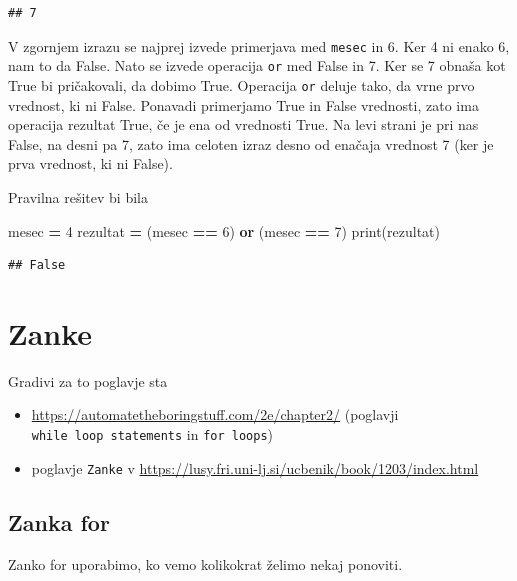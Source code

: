\documentclass[
]{report}
\newenvironment{Shaded}{\begin{snugshade}}{\end{snugshade}}
\newcommand{\BuiltInTok}[1]{#1}
\newcommand{\DecValTok}[1]{\textcolor[rgb]{0.00,0.00,0.81}{#1}}
\newcommand{\KeywordTok}[1]{\textcolor[rgb]{0.13,0.29,0.53}{\textbf{#1}}}
\newcommand{\NormalTok}[1]{#1}
\newcommand{\OperatorTok}[1]{\textcolor[rgb]{0.81,0.36,0.00}{\textbf{#1}}}
\providecommand{\tightlist}{%
  \setlength{\itemsep}{0pt}\setlength{\parskip}{0pt}}
\begin{document}
\begin{verbatim}
## 7
\end{verbatim}

V zgornjem izrazu se najprej izvede primerjava med \texttt{mesec} in 6. Ker 4 ni enako 6,
nam to da False. Nato se izvede operacija \texttt{or} med False in 7. Ker se 7 obnaša
kot True bi pričakovali, da dobimo True. Operacija \texttt{or} deluje tako, da vrne prvo
vrednost, ki ni False. Ponavadi primerjamo True in False vrednosti, zato ima
operacija rezultat True, če je ena od vrednosti True.
Na levi strani je pri nas False, na desni pa 7, zato ima celoten izraz desno
od enačaja vrednost 7 (ker je prva vrednost, ki ni False).

Pravilna rešitev bi bila

\begin{Shaded}
\begin{Highlighting}[]
\NormalTok{mesec }\OperatorTok{=} \DecValTok{4}
\NormalTok{rezultat }\OperatorTok{=}\NormalTok{ (mesec }\OperatorTok{==} \DecValTok{6}\NormalTok{) }\KeywordTok{or}\NormalTok{ (mesec }\OperatorTok{==} \DecValTok{7}\NormalTok{)}
\BuiltInTok{print}\NormalTok{(rezultat)}
\end{Highlighting}
\end{Shaded}

\begin{verbatim}
## False
\end{verbatim}

\hypertarget{zanke}{%
\chapter{Zanke}\label{zanke}}

Gradivi za to poglavje sta

\begin{itemize}
\tightlist
\item
  \url{https://automatetheboringstuff.com/2e/chapter2/} (poglavji \texttt{while\ loop\ statements} in \texttt{for\ loops})
\item
  poglavje \texttt{Zanke} v \url{https://lusy.fri.uni-lj.si/ucbenik/book/1203/index.html}
\end{itemize}

\hypertarget{zanka-for}{%
\section{Zanka for}\label{zanka-for}}

Zanko for uporabimo, ko vemo kolikokrat želimo nekaj ponoviti.
\end{document}
